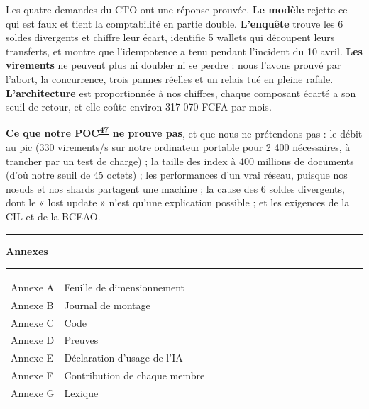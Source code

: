 \documentclass[11pt,a4paper]{article}
\newcommand{\gl}[1]{\textsuperscript{\hyperlink{lex#1}{#1}}}
\begin{document}
	Les quatre demandes du CTO ont une réponse prouvée. \textbf{Le modèle} rejette ce qui est faux et tient la comptabilité en partie double. \textbf{L'enquête} trouve les 6 soldes divergents et chiffre leur écart, identifie 5 wallets qui découpent leurs transferts, et montre que l'idempotence a tenu pendant l'incident du 10 avril. \textbf{Les virements} ne peuvent plus ni doubler ni se perdre : nous l'avons prouvé par l'abort, la concurrence, trois pannes réelles et un relais tué en pleine rafale. \textbf{L'architecture} est proportionnée à nos chiffres, chaque composant écarté a son seuil de retour, et elle coûte environ 317 070 FCFA par mois.
	
	\textbf{Ce que notre POC\gl{47} ne prouve pas}, et que nous ne prétendons pas : le débit au pic (330 virements/s sur notre ordinateur portable pour 2 400 nécessaires, à trancher par un test de charge) ; la taille des index à 400 millions de documents (d'où notre seuil de 45 octets) ; les performances d'un vrai réseau, puisque nos nœuds et nos shards partagent une machine ; la cause des 6 soldes divergents, dont le « lost update » n'est qu'une explication possible ; et les exigences de la CIL et de la BCEAO.
	
	\clearpage
	\appendix
	\thispagestyle{empty}
	\vspace*{\fill}
	\begin{center}
		{\color{bleufaso}\rule{0.6\linewidth}{1.2pt}\par}
		\vspace{0.6cm}
		{\Huge\bfseries Annexes\par}
		\vspace{0.6cm}
		{\color{bleufaso}\rule{0.6\linewidth}{1.2pt}\par}
		\vspace{1.2cm}
		{\large
			\begin{tabular}{@{}ll@{}}
				Annexe A & Feuille de dimensionnement \\[3pt]
				Annexe B & Journal de montage \\[3pt]
				Annexe C & Code \\[3pt]
				Annexe D & Preuves \\[3pt]
				Annexe E & Déclaration d'usage de l'IA \\[3pt]
				Annexe F & Contribution de chaque membre \\[3pt]
				Annexe G & Lexique \\
			\end{tabular}\par}
	\end{center}
	\vspace*{\fill}
	\clearpage
	
\end{document}
